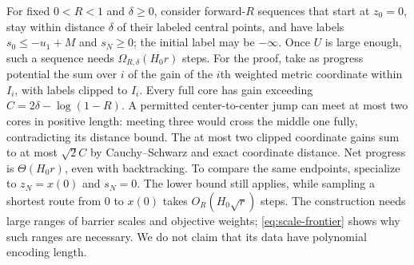 For fixed $0<R<1$ and $\delta\geq0$, consider forward-$R$ sequences
that start at $z_0=0$, stay within distance $\delta$ of their labeled
central points, and have labels $s_0\leq-u_1+M$ and $s_N\geq0$; the
initial label may be $-\infty$. Once $U$ is large enough, such a
sequence needs $\Omega_{R,\delta}(H_0r)$ steps. For the proof, take as
progress potential the sum over $i$ of the gain of the $i$th weighted
metric coordinate within $I_i$, with labels clipped to $I_i$. Every
full core has gain exceeding
$C=2\delta-\log(1-R)$. A permitted center-to-center jump can meet at
most two cores in positive length: meeting three would cross the middle
one fully, contradicting its distance bound. The at most two clipped
coordinate gains sum to at most $\sqrt2C$ by Cauchy--Schwarz and exact
coordinate distance. Net progress is $\Theta(H_0r)$, even with
backtracking. To compare the same endpoints, specialize to
$z_N=x(0)$ and $s_N=0$. The lower bound still applies, while sampling
a shortest route from $0$ to $x(0)$ takes $O_R(H_0\sqrt r)$ steps.
The construction needs large ranges of barrier scales and objective
weights; \eqref{eq:scale-frontier} shows why such ranges are
necessary. We do not claim that its data have polynomial encoding
length.
